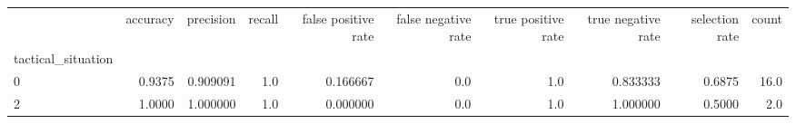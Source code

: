 \begin{tabular}{lrrrrrrrrr}
\toprule
{} &  accuracy &  precision &  recall &  false positive rate &  false negative rate &  true positive rate &  true negative rate &  selection rate &  count \\
tactical\_situation &           &            &         &                      &                      &                     &                     &                 &        \\
\midrule
0                  &    0.9375 &   0.909091 &     1.0 &             0.166667 &                  0.0 &                 1.0 &            0.833333 &          0.6875 &   16.0 \\
2                  &    1.0000 &   1.000000 &     1.0 &             0.000000 &                  0.0 &                 1.0 &            1.000000 &          0.5000 &    2.0 \\
\bottomrule
\end{tabular}
